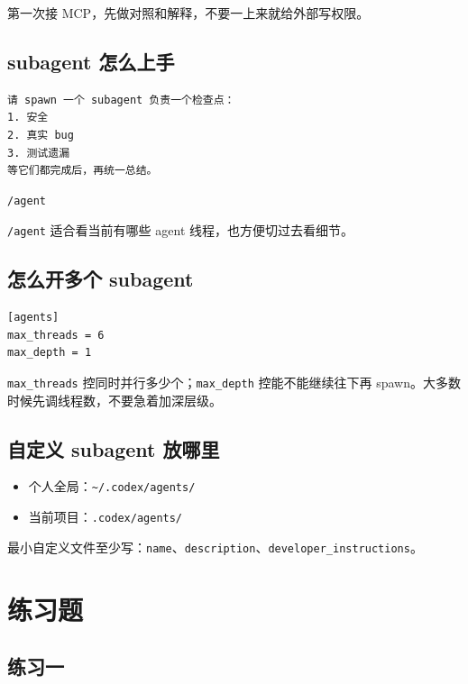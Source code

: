 \documentclass[UTF8,a4paper,11pt]{ctexart}
\begin{document}
\begin{tipbox}
第一次接 MCP，先做对照和解释，不要一上来就给外部写权限。
\end{tipbox}

\subsection{subagent 怎么上手}

\begin{lstlisting}[style=prompt]
请 spawn 一个 subagent 负责一个检查点：
1. 安全
2. 真实 bug
3. 测试遗漏
等它们都完成后，再统一总结。
\end{lstlisting}

\begin{lstlisting}[style=cli]
/agent
\end{lstlisting}

\texttt{/agent} 适合看当前有哪些 agent 线程，也方便切过去看细节。

\subsection{怎么开多个 subagent}

\begin{lstlisting}[style=cli]
[agents]
max_threads = 6
max_depth = 1
\end{lstlisting}

\texttt{max\_threads} 控同时并行多少个；\texttt{max\_depth} 控能不能继续往下再 spawn。大多数时候先调线程数，不要急着加深层级。

\subsection{自定义 subagent 放哪里}

\begin{itemize}
  \item 个人全局：\texttt{\textasciitilde/.codex/agents/}
  \item 当前项目：\texttt{.codex/agents/}
\end{itemize}

最小自定义文件至少写：\texttt{name}、\texttt{description}、\texttt{developer\_instructions}。

\section{练习题}

\subsection{练习一}
\end{document}
